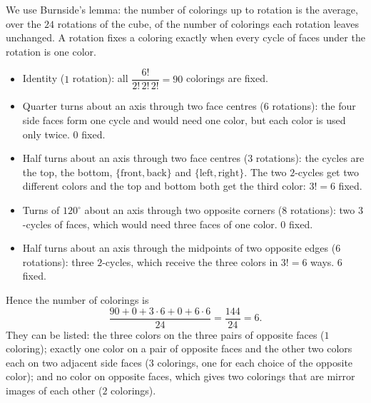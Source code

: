 We use Burnside's lemma: the number of colorings up to rotation is the average, over the $24$ rotations of the cube, of the number of colorings each rotation leaves unchanged. A rotation fixes a coloring exactly when every cycle of faces under the rotation is one color.
\begin{itemize}
\item Identity ($1$ rotation): all $\dfrac{6!}{2!\,2!\,2!}=90$ colorings are fixed.
\item Quarter turns about an axis through two face centres ($6$ rotations): the four side faces form one cycle and would need one color, but each color is used only twice. $0$ fixed.
\item Half turns about an axis through two face centres ($3$ rotations): the cycles are the top, the bottom, $\{\text{front},\text{back}\}$ and $\{\text{left},\text{right}\}$. The two $2$-cycles get two different colors and the top and bottom both get the third color: $3!=6$ fixed.
\item Turns of $120^\circ$ about an axis through two opposite corners ($8$ rotations): two $3$-cycles of faces, which would need three faces of one color. $0$ fixed.
\item Half turns about an axis through the midpoints of two opposite edges ($6$ rotations): three $2$-cycles, which receive the three colors in $3!=6$ ways. $6$ fixed.
\end{itemize}
Hence the number of colorings is
\[
\dfrac{90+0+3\cdot6+0+6\cdot6}{24}=\dfrac{144}{24}=\boxed{6}.
\]
They can be listed: the three colors on the three pairs of opposite faces ($1$ coloring); exactly one color on a pair of opposite faces and the other two colors each on two adjacent side faces ($3$ colorings, one for each choice of the opposite color); and no color on opposite faces, which gives two colorings that are mirror images of each other ($2$ colorings).
